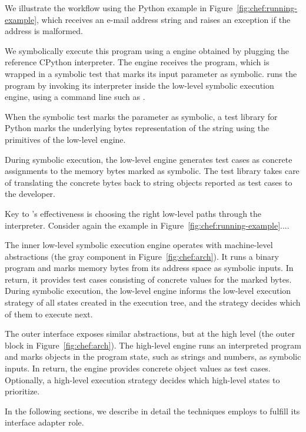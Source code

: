 We illustrate the \chef workflow using the Python example in Figure~\ref{fig:chef:running-example}, which receives an e-mail address string and raises an exception if the address is malformed.



We symbolically execute this program using a \chef engine obtained by plugging the reference CPython interpreter.
%
The \chef engine receives the program, which is wrapped in a symbolic test that marks its input parameter  as symbolic.
%
\chef runs the program by invoking its interpreter inside the low-level symbolic execution engine, using a command line such as .

When the symbolic test marks the  parameter as symbolic, a \chef test library for Python marks the underlying bytes representation of the string using the primitives of the low-level engine.

During symbolic execution, the low-level engine generates test cases as concrete assignments to the memory bytes marked as symbolic.
%
The \chef test library takes care of translating the concrete bytes back to string objects reported as test cases to the developer.

Key to \chef's effectiveness is choosing the right low-level paths through the interpreter.
%
Consider again the example in Figure~\ref{fig:chef:running-example}....


The inner low-level symbolic execution engine operates with machine-level abstractions (the gray component in Figure~\ref{fig:chef:arch}).
%
It runs a binary program and marks memory bytes from its address space as symbolic inputs.  In return, it provides test cases consisting of concrete values for the marked bytes.
%
During symbolic execution, the low-level engine informs the low-level execution strategy of all states created in the execution tree, and the strategy decides which of them to execute next.

The outer interface exposes similar abstractions, but at the high level (the outer block in Figure~\ref{fig:chef:arch}).
%
The high-level engine runs an interpreted program and marks objects in the program state, such as strings and numbers, as symbolic inputs.  In return, the engine provides concrete object values as test cases.
%
Optionally, a high-level execution strategy decides which high-level states to prioritize.

In the following sections, we describe in detail the techniques \chef employs to fulfill its interface adapter role.

